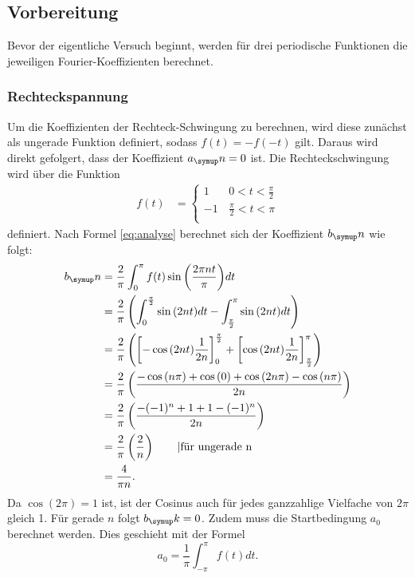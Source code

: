 \subsection{Vorbereitung}
Bevor der eigentliche Versuch beginnt, werden für drei periodische Funktionen
die jeweiligen Fourier-Koeffizienten berechnet.
\subsubsection{Rechteckspannung}
Um die Koeffizienten der Rechteck-Schwingung zu berechnen, wird diese zunächst
als ungerade Funktion definiert, sodass $f(t)=-f(-t)$ gilt. Daraus wird direkt
gefolgert, dass der Koeffizient $a_\su{n}=0$ ist.
Die Rechteckschwingung wird über die Funktion
  \begin{align}
  f(t)&=
  \begin{cases}
    1 & \, 0<t<\frac{\pi}{2} \\
    -1& \, \frac{\pi}{2}<t<\pi \\
  \end{cases}
\end{align}
definiert. Nach Formel \eqref{eq:analyse} berechnet sich der Koeffizient $b_\su{n}$
wie folgt:
\begin{align*}
  b_\su{n} &= \frac{2}{\pi}\int^\pi_0{f(t)\sin{\left(\frac{2\pi n t}{\pi}\right)} dt} \\
  &= \frac{2}{\pi}\left(\int_0^{\frac{\pi}{2}}{\sin{(2nt)} dt} -
  \int_{\frac{\pi}{2}}^\pi{\sin{(2nt)} dt}\right) \\
  &= \frac{2}{\pi}\left(\left[-\cos{(2nt)}\frac{1}{2n}\right]_0^{\frac{\pi}{2}} +
  \left[\cos{(2nt)}\frac{1}{2n}\right]_{\frac{\pi}{2}}^\pi\right) \\
  &= \frac{2}{\pi}\left(\frac{-\cos{(n\pi)}+\cos{(0)}+\cos{(2n\pi)}-\cos{(n\pi)}}{2n}\right) \\
  &= \frac{2}{\pi}\left(\frac{-(-1)^n+1+1-(-1)^n}{2n}\right) \\
  &= \frac{2}{\pi}\left(\frac{2}{n}\right) \qquad \text{|für ungerade n}\\
  &= \frac{4}{\pi n}.
\end{align*}
Da $\cos{(2\pi)}=1$ ist, ist der Cosinus auch für jedes ganzzahlige Vielfache von
$2\pi$ gleich 1. Für gerade $n$ folgt $b_\su{k}=0$.
Zudem muss die Startbedingung $a_0$ berechnet werden. Dies geschieht mit der
Formel
\begin{equation*}
  a_0 = \frac{1}{\pi}\int_{-\pi}^\pi{f(t) dt}.
\end{equation*}
